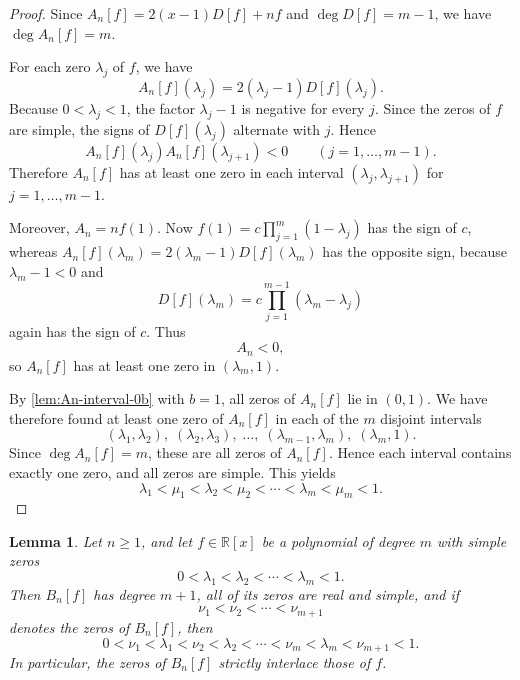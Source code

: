 \documentclass[11pt,twoside]{article}
\newtheorem{lemma}[theorem]{Lemma}
\numberwithin{equation}{section}
\begin{document}
\begin{proof}
Since \(A_n[f]=2(x-1)D[f]+nf\) and \(\deg D[f]=m-1\), we have \(\deg A_n[f]=m\).

For each zero \(\lambda_j\) of \(f\), we have
\[
A_n[f](\lambda_j)=2(\lambda_j-1)D[f](\lambda_j).
\]
Because \(0<\lambda_j<1\), the factor \(\lambda_j-1\) is negative for every \(j\). Since the zeros of \(f\) are simple, the signs of \(D[f](\lambda_j)\) alternate with \(j\). Hence
\[
A_n[f](\lambda_j)A_n[f](\lambda_{j+1})<0
\qquad (j=1,\dots,m-1).
\]
Therefore \(A_n[f]\) has at least one zero in each interval \((\lambda_j,\lambda_{j+1})\) for \(j=1,\dots,m-1\).

Moreover, \(A_n=n f(1)\). Now \(f(1)=c\prod_{j=1}^m(1-\lambda_j)\) has the sign of \(c\), whereas \(A_n[f](\lambda_m)=2(\lambda_m-1)D[f](\lambda_m)\) has the opposite sign, because \(\lambda_m-1<0\) and
\[
D[f](\lambda_m)=c\prod_{j=1}^{m-1}(\lambda_m-\lambda_j)
\]
again has the sign of \(c\). Thus
\[
A_n<0,
\]
so \(A_n[f]\) has at least one zero in \((\lambda_m,1)\).

By \cref{lem:An-interval-0b} with \(b=1\), all zeros of \(A_n[f]\) lie in \((0,1)\). We have therefore found at least one zero of \(A_n[f]\) in each of the \(m\) disjoint intervals
\[
(\lambda_1,\lambda_2),\;(\lambda_2,\lambda_3),\;\dots,\;(\lambda_{m-1},\lambda_m),\;(\lambda_m,1).
\]
Since \(\deg A_n[f]=m\), these are all zeros of \(A_n[f]\). Hence each interval contains exactly one zero, and all zeros are simple. This yields
\[
\lambda_1<\mu_1<\lambda_2<\mu_2<\cdots<\lambda_m<\mu_m<1.
\]
\end{proof}

\begin{lemma}\label{lem:Bn-interlacing}
Let \(n\ge 1\), and let \(f\in\mathbb R[x]\) be a polynomial of degree \(m\) with simple zeros
\[
0<\lambda_1<\lambda_2<\cdots<\lambda_m<1.
\]
Then \(B_n[f]\) has degree \(m+1\), all of its zeros are real and simple, and if
\[
\nu_1<\nu_2<\cdots<\nu_{m+1}
\]
denotes the zeros of \(B_n[f]\), then
\[
0<\nu_1<\lambda_1<\nu_2<\lambda_2<\cdots<\nu_m<\lambda_m<\nu_{m+1}<1.
\]
In particular, the zeros of \(B_n[f]\) strictly interlace those of \(f\).
\end{lemma}
\end{document}
